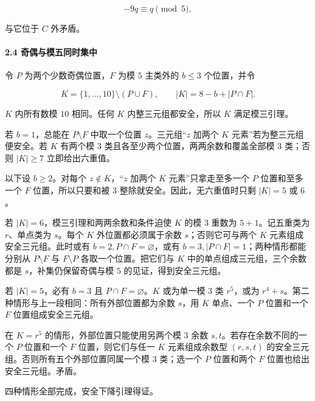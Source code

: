 \[
-9q\equiv q\pmod5,
\]

{与它位于} \(C\) {外矛盾。}

\paragraph*{\texorpdfstring{{2.4} {奇偶与模五同时集中}}{2.4 奇偶与模五同时集中}}\label{C35-h234}

{令} \(P\) {为两个少数奇偶位置，}\(F\) {为模} \(5\) {主类外的} \(b\le3\) {个位置，并令}

\[
K=\{1,\ldots,10\}\setminus(P\cup F),\qquad
|K|=8-b+|P\cap F|.
\]

\(K\) {内所有数模} \(10\) {相同。任何} \(K\) {内整三元组都安全，所以} \(K\) {满足模三引理。}

{若} \(b=1\){，总能在} \(P\setminus F\) {中取一个位置} \(z\){。三元组``}\(z\) {加两个} \(K\) {元素''若为整三元组便安全。若} \(K\) {有两个模} \(3\) {类且各至少两个位置，两两余数和覆盖全部模} \(3\) {类；否则} \(|K|\ge7\) {立即给出六重值。}

{以下设} \(b\ge2\){。对每个} \(z\notin K\){，``}\(z\) {加两个} \(K\) {元素''只拿走至多一个} \(P\) {位置和至多一个} \(F\) {位置，所以只要和被} \(3\) {整除就安全。因此，无六重值时只剩} \(|K|=5\) {或} \(6\){。}

{若} \(|K|=6\){，模三引理和两两余数和条件迫使} \(K\) {的模} \(3\) {重数为} \(5+1\){。记五重类为} \(r\){、单点类为} \(s\){。每个} \(K\) {外位置都必须属于余数} \(s\){；否则它可与两个} \(K\) {元素组成安全三元组。此时或有} \(b=2,P\cap F=\varnothing\){，或有} \(b=3,|P\cap F|=1\){；两种情形都能分别从} \(P\setminus F\) {与} \(F\setminus P\) {各取一个位置。把它们与} \(K\) {中的单点组成三元组，三个余数都是} \(s\){，补集仍保留奇偶与模} \(5\) {的见证，得到安全三元组。}

{若} \(|K|=5\){，必有} \(b=3\) {且} \(P\cap F=\varnothing\){。}\(K\) {或为单一模} \(3\) {类} \(r^5\){，或为} \(r^4+s\){。第二种情形与上一段相同：所有外部位置都为余数} \(s\){，用} \(K\) {单点、一个} \(P\) {位置和一个} \(F\) {位置组成安全三元组。}

{在} \(K=r^5\) {的情形，外部位置只能使用另两个模} \(3\) {余数} \(s,t\){。若存在余数不同的一个} \(P\) {位置和一个} \(F\) {位置，则它们与任一} \(K\) {元素组成余数型} \((r,s,t)\) {的安全三元组。否则所有五个外部位置同属一个模} \(3\) {类；选一个} \(P\) {位置和两个} \(F\) {位置也给出安全三元组。矛盾。}

{四种情形全部完成，安全下降引理得证。}


